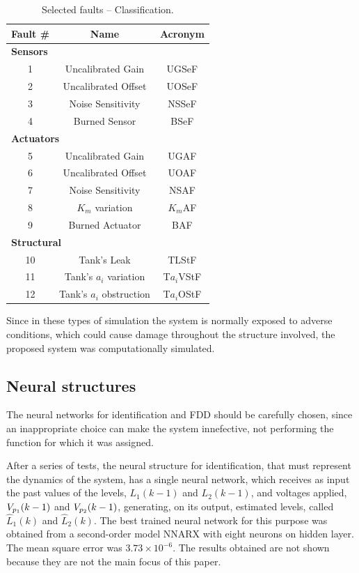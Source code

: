 \documentclass[10pt,fleqn,a4paper]{article}
\begin{document}
\begin{table}[!htb]
\centering
\caption{Selected faults -- Classification.}
\label{tab:faults}
\begin{tabular}{|c|c|c|}
\hline
{\bf Fault \#} & {\bf Name} & {\bf Acronym}\\
\hline
\multicolumn{3}{|l|}{\bf Sensors}\\
\hline
1 & Uncalibrated Gain & UGSeF\\
\hline
2 & Uncalibrated Offset & UOSeF\\
\hline
3 & Noise Sensitivity & NSSeF\\
\hline
4 & Burned Sensor & BSeF\\
\hline
\multicolumn{3}{|l|}{\bf Actuators}\\
\hline
5 & Uncalibrated Gain & UGAF\\
\hline
6 & Uncalibrated Offset & UOAF\\
\hline
7 & Noise Sensitivity & NSAF\\
\hline
8 & $K_m$ variation & $K_m$AF\\
\hline
9 & Burned Actuator & BAF\\
\hline
\multicolumn{3}{|l|}{\bf Structural}\\
\hline
10 & Tank's Leak & TLStF\\
\hline
11 & Tank's $a_i$ variation & T$a_i$VStF\\
\hline
12 & Tank's $a_i$ obstruction & T$a_i$OStF\\
\hline
\end{tabular}
\end{table}

Since in these types of simulation the system is normally exposed to adverse
conditions, which could cause damage throughout the structure involved, the
proposed system was computationally simulated.

\subsection{Neural structures}
The neural networks for identification and FDD should be carefully chosen, since
an inappropriate choice can make the system innefective, not performing the
function for which it was assigned.

After a series of tests, the neural structure for identification, that must
represent the dynamics of the system, has a single neural network, which
receives as input the past values of the levels, $L_1(k-1)$ and $L_2 (k-1)$, and
voltages applied, $V_{p_{\tiny 1}} (k-1)$ and $V_{p_{\tiny 2}} (k-1)$,
generating, on its output, estimated levels, called $\widehat{L}_1 (k)$ and
$\widehat{L}_2 (k)$.  The best trained neural network for this purpose was
obtained from a second-order model NNARX with eight neurons on hidden layer. The
mean square error was $3.73 \times 10^{-6}$. The results obtained are not shown
because they are not the main focus of this paper.
\end{document}
